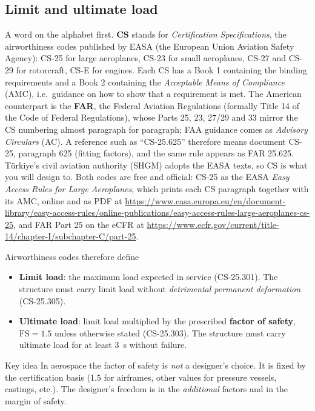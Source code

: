 \documentclass[11pt,a4paper]{article}
\begin{document}
\subsection{Limit and ultimate load}

A word on the alphabet first. \textbf{CS} stands for \emph{Certification Specifications}, the airworthiness codes published by EASA (the European Union Aviation Safety Agency): CS-25 for large aeroplanes, CS-23 for small aeroplanes, CS-27 and CS-29 for rotorcraft, CS-E for engines. Each CS has a Book 1 containing the binding requirements and a Book 2 containing the \emph{Acceptable Means of Compliance} (AMC), i.e.\ guidance on how to show that a requirement is met. The American counterpart is the \textbf{FAR}, the Federal Aviation Regulations (formally Title 14 of the Code of Federal Regulations), whose Parts 25, 23, 27/29 and 33 mirror the CS numbering almost paragraph for paragraph; FAA guidance comes as \emph{Advisory Circulars} (AC). A reference such as ``CS-25.625'' therefore means document CS-25, paragraph 625 (fitting factors), and the same rule appears as FAR 25.625. Türkiye's civil aviation authority (SHGM) adopts the EASA texts, so CS is what you will design to. Both codes are free and official: CS-25 as the EASA \emph{Easy Access Rules for Large Aeroplanes}, which prints each CS paragraph together with its AMC, online and as PDF at \url{https://www.easa.europa.eu/en/document-library/easy-access-rules/online-publications/easy-access-rules-large-aeroplanes-cs-25}, and FAR Part 25 on the eCFR at \url{https://www.ecfr.gov/current/title-14/chapter-I/subchapter-C/part-25}.

Airworthiness codes therefore define
\begin{itemize}[nosep]
  \item \textbf{Limit load}: the maximum load expected in service (CS-25.301). The structure must carry limit load without \emph{detrimental permanent deformation} (CS-25.305).
  \item \textbf{Ultimate load}: limit load multiplied by the prescribed \textbf{factor of safety}, $\mathrm{FS}=1.5$ unless otherwise stated (CS-25.303). The structure must carry ultimate load for at least \SI{3}{\second} without failure.
\end{itemize}

\begin{keybox}{Key idea}
In aerospace the factor of safety is \emph{not} a designer's choice. It is fixed by the certification basis (1.5 for airframes, other values for pressure vessels, castings, etc.). The designer's freedom is in the \emph{additional} factors and in the margin of safety.
\end{keybox}
\end{document}
